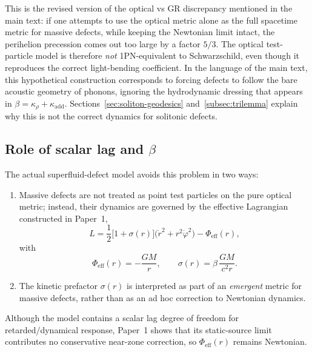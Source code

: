 \documentclass[11pt]{article}
\begin{document}
This is the revised version of the optical vs GR discrepancy mentioned in
the main text: if one attempts to use the optical metric alone as the full
spacetime metric for massive defects, while keeping the Newtonian limit
intact, the perihelion precession comes out too large by a factor $5/3$.
The optical test-particle model is therefore \emph{not} 1PN-equivalent to
Schwarzschild, even though it reproduces the correct light-bending
coefficient.
In the language of the main text, this hypothetical construction
corresponds to forcing defects to follow the bare acoustic geometry of
phonons, ignoring the hydrodynamic dressing that appears in
$\beta = \kappa_\rho + \kappa_{\mathrm{add}}$.
Sections~\ref{sec:soliton-geodesics} and~\ref{subsec:trilemma} explain
why this is not the correct dynamics for solitonic defects.


\subsection{Role of scalar lag and \texorpdfstring{$\beta$}{beta}}
\label{subsec:app-role-beta}

The actual superfluid-defect model avoids this problem in two ways:

\begin{enumerate}
  \item Massive defects are not treated as point test particles on the
        pure optical metric; instead, their dynamics are governed by the
        effective Lagrangian constructed in Paper~1,
        \begin{equation}
          L
          = \frac{1}{2}\bigl[1 + \sigma(r)\bigr]
              \bigl(\dot r^2 + r^2 \dot\varphi^2\bigr)
            - \Phi_{\mathrm{eff}}(r),
          \label{eq:app-ppn-L-eff-again}
        \end{equation}
        with
        \begin{equation}
          \Phi_{\mathrm{eff}}(r)
          = -\frac{GM}{r},
          \qquad
          \sigma(r) = \beta\,\frac{GM}{c^2 r}.
        \end{equation}

  \item The kinetic prefactor $\sigma(r)$ is interpreted as part of an
        \emph{emergent} metric for massive defects, rather than as an ad hoc
        correction to Newtonian dynamics.
\end{enumerate}

Although the model contains a scalar lag degree of freedom for
retarded/dynamical response, Paper~1 shows that its static-source limit
contributes no conservative near-zone correction, so $\Phi_{\mathrm{eff}}(r)$
remains Newtonian.
\end{document}

